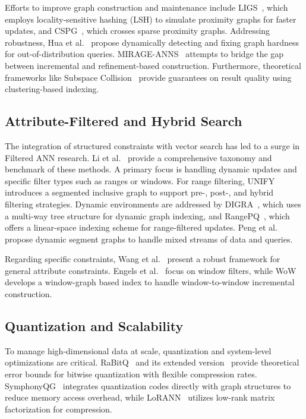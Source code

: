 \documentclass[sigconf,nonacm]{acmart}
\theoremstyle{plain}
\theoremstyle{definition}
\theoremstyle{remark}
\begin{document}
Efforts to improve graph construction and maintenance include LIGS~\cite{10.1145/3726302.3730028}, which employs locality-sensitive hashing (LSH) to simulate proximity graphs for faster updates, and CSPG~\cite{DBLP:conf/nips/YangCZ24}, which crosses sparse proximity graphs. 
Addressing robustness, Hua et al.~\cite{10.1145/3769783} propose dynamically detecting and fixing graph hardness for out-of-distribution queries. MIRAGE-ANNS~\cite{10.1145/3725325} attempts to bridge the gap between incremental and refinement-based construction. 
Furthermore, theoretical frameworks like Subspace Collision~\cite{10.1145/3709729} provide guarantees on result quality using clustering-based indexing.

\subsection{Attribute-Filtered and Hybrid Search}

The integration of structured constraints with vector search has led to a surge in Filtered ANN research. Li et al.~\cite{10.1145/3769763} provide a comprehensive taxonomy and benchmark of these methods. 
A primary focus is handling dynamic updates and specific filter types such as ranges or windows. 
For range filtering, UNIFY~\cite{10.14778/3717755.3717770} introduces a segmented inclusive graph to support pre-, post-, and hybrid filtering strategies. 
Dynamic environments are addressed by DIGRA~\cite{10.1145/3725399}, which uses a multi-way tree structure for dynamic graph indexing, and RangePQ~\cite{10.1145/3725401}, which offers a linear-space indexing scheme for range-filtered updates. 
Peng et al.~\cite{10.14778/3748191.3748193} propose dynamic segment graphs to handle mixed streams of data and queries.

Regarding specific constraints, Wang et al.~\cite{DBLP:conf/nips/WangLX0YN23} present a robust framework for general attribute constraints. 
Engels et al.~\cite{engels2024approximate} focus on window filters, while WoW~\cite{10.1145/3769843} develops a window-graph based index to handle window-to-window incremental construction.

\subsection{Quantization and Scalability}

To manage high-dimensional data at scale, quantization and system-level optimizations are critical. 
RaBitQ~\cite{10.1145/3654970} and its extended version~\cite{10.1145/3725413} provide theoretical error bounds for bitwise quantization with flexible compression rates. 
SymphonyQG~\cite{10.1145/3709730} integrates quantization codes directly with graph structures to reduce memory access overhead, while LoRANN~\cite{DBLP:conf/nips/JaasaariHR24} utilizes low-rank matrix factorization for compression.
\end{document}
